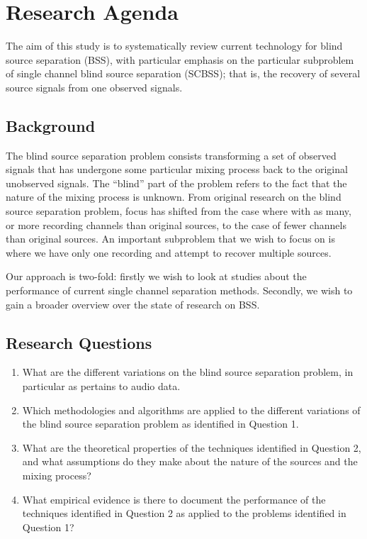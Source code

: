 \newpage
\appendix


\section{Research Agenda}\label{protocol}
The aim of this study is to systematically review current technology
for blind source separation (BSS), with particular emphasis on the
particular subproblem of single channel blind source separation
(SCBSS); that is, the recovery of several source signals from one observed signals.


\subsection{Background}
The blind source separation problem consists transforming a set of observed signals that has undergone some particular mixing process back to the original unobserved signals. The “blind” part of the problem refers to the fact that the nature of the mixing process is unknown. From original research on the blind source separation problem, focus has shifted from the case where with as many, or more recording channels than original sources, to the case of fewer channels than original sources. An important subproblem that we wish to focus on is where we have only one recording and attempt to recover multiple sources.

Our approach is two-fold: firstly we wish to look at studies about the performance of current single channel separation methods. Secondly, we wish to gain a broader overview over the state of research on BSS.

\subsection{Research Questions}
\begin{enumerate}
  \item What are the different variations on the blind source
    separation problem, in particular as pertains to audio data.
  \item Which methodologies and algorithms are applied to the
    different variations of the blind source separation problem as identified in Question 1.
  \item What are the theoretical properties of the techniques
    identified in Question 2, and  what assumptions do they make about the nature of the sources and the mixing process?
  \item What empirical evidence is there to document the performance
    of the techniques identified in Question 2 as applied to the
    problems identified in Question 1?
\end{enumerate}



